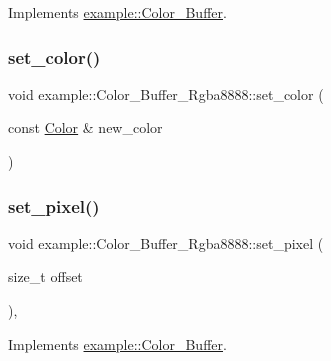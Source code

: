 Implements \mbox{\hyperlink{classexample_1_1_color___buffer_a3fbfa949ee340ccdb40ad0ce8339b827}{example\+::\+Color\+\_\+\+Buffer}}.

\mbox{\label{classexample_1_1_color___buffer___rgba8888_a5033d0d18293c92936fd2ff5318e3f0f}} 
\subsubsection{\texorpdfstring{set\_color()}{set\_color()}\hspace{0.1cm}{\footnotesize\ttfamily [2/2]}}
{\footnotesize\ttfamily void example\+::\+Color\+\_\+\+Buffer\+\_\+\+Rgba8888\+::set\+\_\+color (\begin{DoxyParamCaption}\item[{const \mbox{\hyperlink{structexample_1_1_color___buffer___rgba8888_1_1_color}{Color}} \&}]{new\+\_\+color }\end{DoxyParamCaption})\hspace{0.3cm}{\ttfamily [inline]}}

\mbox{\label{classexample_1_1_color___buffer___rgba8888_ac741fa7bca9b980a475e6f7033b64347}} 
\subsubsection{\texorpdfstring{set\_pixel()}{set\_pixel()}\hspace{0.1cm}{\footnotesize\ttfamily [1/2]}}
{\footnotesize\ttfamily void example\+::\+Color\+\_\+\+Buffer\+\_\+\+Rgba8888\+::set\+\_\+pixel (\begin{DoxyParamCaption}\item[{size\+\_\+t}]{offset }\end{DoxyParamCaption})\hspace{0.3cm}{\ttfamily [inline]}, {\ttfamily [virtual]}}



Implements \mbox{\hyperlink{classexample_1_1_color___buffer_a1c919e629ef74e418e1ad416d0a5e85a}{example\+::\+Color\+\_\+\+Buffer}}.

